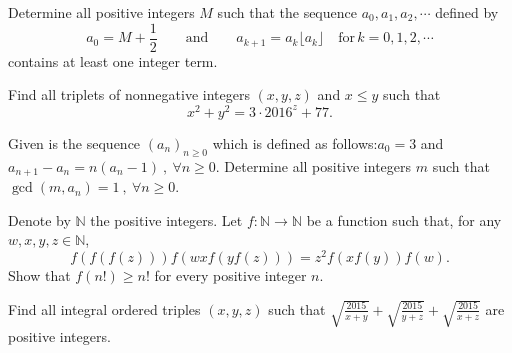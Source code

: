 \documentclass[problems.tex]{subfile}
\begin{document}
	
	
	\begin{problem}
		Determine all positive integers $M$ such that the sequence $a_0, a_1, a_2, \cdots$ defined by \[ a_0 = M + \frac{1}{2} \qquad \textrm{and} \qquad a_{k+1} = a_k\lfloor a_k \rfloor \quad \textrm{for} \, k = 0, 1, 2, \cdots \]contains at least one integer term. %
	\end{problem}
	
	
	
	\begin{problem}[Greece 2016]
		Find all triplets of nonnegative integers $(x,y,z)$ and $x\leq y$ such that
		$$x^2+y^2=3 \cdot 2016^z+77.$$
	\end{problem}
	
	
	
	
	\begin{problem}
		Given is the sequence $(a_n)_{n\geq 0}$ which is defined as follows:$a_0=3$ and $a_{n+1}-a_n=n(a_n-1) \ , \ \forall n\geq 0$. Determine all positive integers $m$ such that $\gcd (m,a_n)=1 \ , \ \forall n\geq 0$. %
	\end{problem}
	
	
	
	\begin{problem}
		Denote by $\mathbb{N}$ the positive integers. Let $f:\mathbb{N} \rightarrow \mathbb{N}$ be a function such that, for any $w,x,y,z \in \mathbb{N}$, \[ f(f(f(z)))f(wxf(yf(z)))=z^{2}f(xf(y))f(w). \]Show that $f(n!) \ge n!$ for every positive integer $n$. %
	\end{problem}
	
	
	
	\begin{problem}
		Find all integral ordered triples $(x,y,z)$ such that $\displaystyle\sqrt{\frac{2015}{x+y}}+\sqrt{\frac{2015}{y+z}}+\sqrt{\frac{2015}{x+z}}$ are positive integers. %
	\end{problem}
	
	
	
\end{document}

